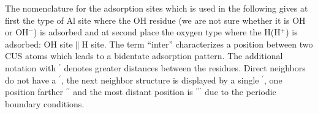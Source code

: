 \documentclass[11pt,DIV=13,BCOR=5mm,a4paper,headinclude]{scrbook}
\begin{document}
The nomenclature for the adsorption sites which is used in the following gives at first the type of Al site where the OH residue (we are not sure whether it is OH or OH$^-$) is adsorbed and at second place the oxygen type where the H(H$^+$) is adsorbed: OH site$\parallel$H site.
The term ``inter'' characterizes a position between two CUS atoms which leads to a bidentate adsorption pattern.
The additional notation with $^\prime$ denotes greater distances between the residues.
Direct neighbors do not have a $^\prime$, the next neighbor structure is displayed by a single $^\prime$, one position farther $^{\prime\prime}$ and the most distant position is $^{\prime\prime\prime}$ due to the periodic boundary conditions.
\end{document}
